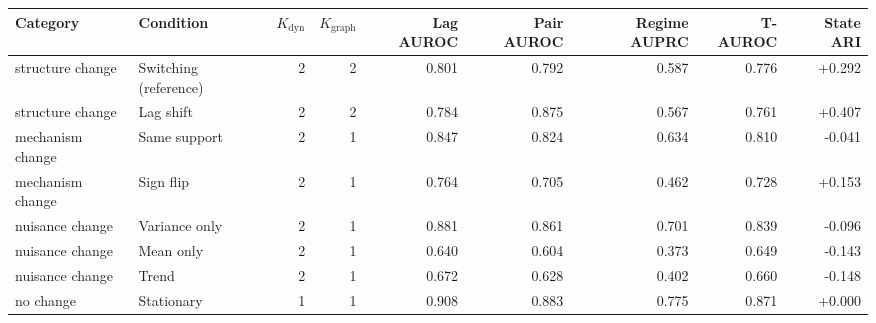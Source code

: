 \begin{tabular}{llrrrrrrr}
\toprule
Category & Condition & $K_{\mathrm{dyn}}$ & $K_{\mathrm{graph}}$ & Lag AUROC & Pair AUROC & Regime AUPRC & T-AUROC & State ARI \\
\midrule
structure change & Switching (reference) & 2 & 2 & 0.801 & 0.792 & 0.587 & 0.776 & +0.292 \\
structure change & Lag shift & 2 & 2 & 0.784 & 0.875 & 0.567 & 0.761 & +0.407 \\
\midrule
mechanism change & Same support & 2 & 1 & 0.847 & 0.824 & 0.634 & 0.810 & -0.041 \\
mechanism change & Sign flip & 2 & 1 & 0.764 & 0.705 & 0.462 & 0.728 & +0.153 \\
\midrule
nuisance change & Variance only & 2 & 1 & 0.881 & 0.861 & 0.701 & 0.839 & -0.096 \\
nuisance change & Mean only & 2 & 1 & 0.640 & 0.604 & 0.373 & 0.649 & -0.143 \\
nuisance change & Trend & 2 & 1 & 0.672 & 0.628 & 0.402 & 0.660 & -0.148 \\
\midrule
no change & Stationary & 1 & 1 & 0.908 & 0.883 & 0.775 & 0.871 & +0.000 \\
\bottomrule
\end{tabular}
